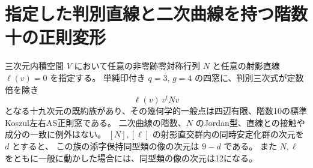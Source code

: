 \section{指定した判別直線と二次曲線を持つ階数十の正則変形}
\label{sec:marked-prescribed-discriminant-as}
\begin{theorem}\label{thm:marked-prescribed-discriminant-as}
三次元内積空間 $V$ において任意の非零跡零対称行列 $N$ と任意の射影直線 $\ell(v)=0$ を指定する。
単純印付き $q=3$, $g=4$ の四窓に、判別三次式が定数倍を除き
\[
                       \ell(v)\,v^tNv
\]
となる十九次元の既約族があり、その幾何学的一般点は四辺有限、階数10の標準Koszul左右AS正則窓である。
二次曲線の階数、$N$ のJordan型、直線との接触や成分の一致に例外はない。
$[N],[\ell]$ の射影直交群内の同時安定化群の次元を $d$ とすると、
この族の添字保持同型類の像の次元は $9-d$ である。
また $N,\ell$ をともに一般に動かした場合には、同型類の像の次元は12になる。
\end{theorem}
